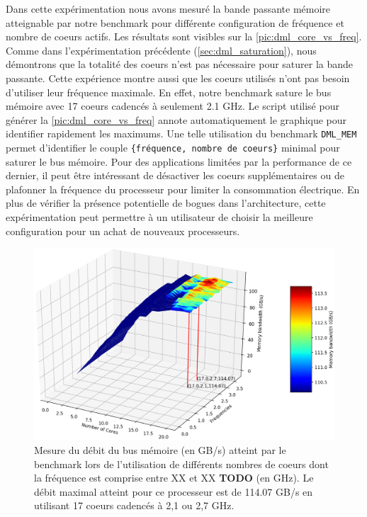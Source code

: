     Dans cette expérimentation nous avons mesuré la bande passante mémoire atteignable par notre benchmark pour différente configuration de fréquence et nombre de coeurs actifs. Les résultats sont visibles sur la \autoref{pic:dml_core_vs_freq}. Comme dans l'expérimentation précédente (\autoref{sec:dml_saturation}), nous démontrons que la totalité des coeurs n'est pas nécessaire pour saturer la bande passante. Cette expérience montre aussi que les coeurs utilisés n'ont pas besoin d'utiliser leur fréquence maximale. En effet, notre benchmark sature le bus mémoire avec 17 coeurs cadencés à seulement 2.1 GHz. Le script utilisé pour générer la \autoref{pic:dml_core_vs_freq} annote automatiquement le graphique pour identifier rapidement les maximums. Une telle utilisation du benchmark \verb=DML_MEM= permet d'identifier le couple  \verb|{fréquence, nombre de coeurs}| minimal pour saturer le bus mémoire. Pour des applications limitées par la performance de ce dernier, il peut être intéressant de désactiver les coeurs supplémentaires ou de plafonner la fréquence du processeur pour limiter la consommation électrique. En plus de vérifier la présence potentielle de bogues dans l'architecture, cette expérimentation peut permettre à un utilisateur de choisir la meilleure configuration pour un achat de nouveaux processeurs. 
    
    \begin{figure}[ht]
    \center
    \includegraphics[width=14cm]{images/dml_core_vs_freq.png}
    \caption{\label{pic:dml_core_vs_freq}  Mesure du débit du bus mémoire (en GB/s) atteint par le benchmark lors de l'utilisation de différents nombres de coeurs dont la fréquence est comprise entre XX et XX \textbf{TODO} (en GHz). Le débit maximal atteint pour ce processeur est de 114.07 GB/s en utilisant 17 coeurs cadencés à 2,1 ou 2,7 GHz.}
    \end{figure}
    


